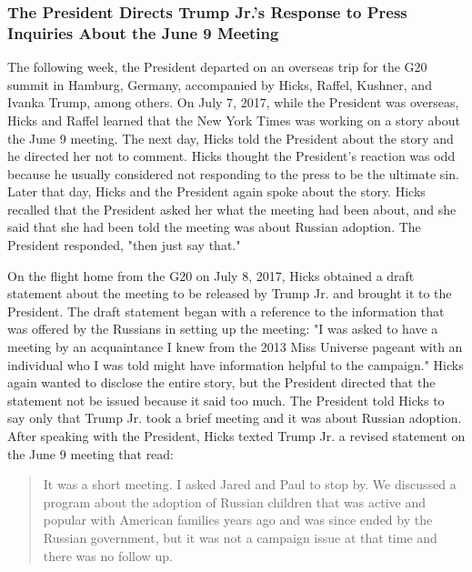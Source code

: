 \subsubsection{The President Directs Trump Jr.'s Response to Press Inquiries About the June 9 Meeting}

The following week, the President departed on an overseas trip for the G20 summit in Hamburg, Germany, accompanied by Hicks, Raffel, Kushner, and Ivanka Trump, among others.%
On July 7, 2017, while the President was overseas, Hicks and Raffel learned that the New York Times was working on a story about the June 9 meeting.%
The next day, Hicks told the President about the story and he directed her not to comment.%
Hicks thought the President's reaction was odd because he usually considered not responding to the press to be the ultimate sin.%
Later that day, Hicks and the President again spoke about the story.%
Hicks recalled that the President asked her what the meeting had been about, and she said that she had been told the meeting was about Russian adoption.%
The President responded, "then just say that."%

On the flight home from the G20 on July 8, 2017, Hicks obtained a draft statement about the meeting to be released by Trump Jr. and brought it to the President.%
The draft statement began with a reference to the information that was offered by the Russians in setting up the meeting: "I was asked to have a meeting by an acquaintance I knew from the 2013 Miss Universe pageant with an individual who I was told might have information helpful to the campaign."%
Hicks again wanted to disclose the entire story, but the President directed that the statement not be
issued because it said too much.%
The President told Hicks to say only that Trump Jr. took a brief meeting and it was about Russian adoption.%
After speaking with the President, Hicks texted Trump Jr. a revised statement on the June 9 meeting that read:

\begin{quote}
It was a short meeting.
I asked Jared and Paul to stop by.
We discussed a program about the adoption of Russian children that was active and popular with American families years ago and was since ended by the Russian government, but it was not a campaign issue at that time and there was no follow up.%
\end{quote}

